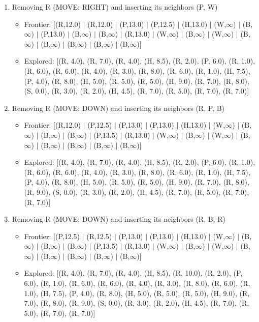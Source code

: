 \documentclass[12pt]{article}
\begin{document}
\begin{enumerate}
\item Removing R (MOVE: RIGHT) and inserting its neighbors (P, W)
\begin{itemize}
\item Frontier: [(R,12.0) \(|\) (R,12.0) \(|\) (P,13.0) \(|\) (P,12.5) \(|\) (H,13.0) \(|\) (W,\(\infty\)) \(|\) (B,\(\infty\)) \(|\) (P,13.0) \(|\) (B,\(\infty\)) \(|\) (B,\(\infty\)) \(|\) (R,13.0) \(|\) (W,\(\infty\)) \(|\) (B,\(\infty\)) \(|\) (W,\(\infty\)) \(|\) (B,\(\infty\)) \(|\) (B,\(\infty\)) \(|\) (B,\(\infty\)) \(|\) (B,\(\infty\)) \(|\) (B,\(\infty\))]
\item Explored: [(R, 4.0), (R, 7.0), (R, 4.0), (H, 8.5), (R, 2.0), (P, 6.0), (R, 1.0), (R, 6.0), (R, 6.0), (R, 4.0), (R, 3.0), (R, 8.0), (R, 6.0), (R, 1.0), (H, 7.5), (P, 4.0), (R, 8.0), (H, 5.0), (R, 5.0), (R, 5.0), (H, 9.0), (R, 7.0), (R, 8.0), (S, 0.0), (R, 3.0), (R, 2.0), (H, 4.5), (R, 7.0), (R, 5.0), (R, 7.0), (R, 7.0)]
\end{itemize}

\item Removing R (MOVE: DOWN) and inserting its neighbors (R, P, B)
\begin{itemize}
\item Frontier: [(R,12.0) \(|\) (P,12.5) \(|\) (P,13.0) \(|\) (P,13.0) \(|\) (H,13.0) \(|\) (W,\(\infty\)) \(|\) (B,\(\infty\)) \(|\) (B,\(\infty\)) \(|\) (B,\(\infty\)) \(|\) (P,13.5) \(|\) (R,13.0) \(|\) (W,\(\infty\)) \(|\) (B,\(\infty\)) \(|\) (W,\(\infty\)) \(|\) (B,\(\infty\)) \(|\) (B,\(\infty\)) \(|\) (B,\(\infty\)) \(|\) (B,\(\infty\)) \(|\) (B,\(\infty\))]
\item Explored: [(R, 4.0), (R, 7.0), (R, 4.0), (H, 8.5), (R, 2.0), (P, 6.0), (R, 1.0), (R, 6.0), (R, 6.0), (R, 4.0), (R, 3.0), (R, 8.0), (R, 6.0), (R, 1.0), (H, 7.5), (P, 4.0), (R, 8.0), (H, 5.0), (R, 5.0), (R, 5.0), (H, 9.0), (R, 7.0), (R, 8.0), (R, 9.0), (S, 0.0), (R, 3.0), (R, 2.0), (H, 4.5), (R, 7.0), (R, 5.0), (R, 7.0), (R, 7.0)]
\end{itemize}

\item Removing R (MOVE: DOWN) and inserting its neighbors (R, B, R)
\begin{itemize}
\item Frontier: [(P,12.5) \(|\) (R,12.5) \(|\) (P,13.0) \(|\) (P,13.0) \(|\) (H,13.0) \(|\) (W,\(\infty\)) \(|\) (B,\(\infty\)) \(|\) (B,\(\infty\)) \(|\) (B,\(\infty\)) \(|\) (P,13.5) \(|\) (R,13.0) \(|\) (W,\(\infty\)) \(|\) (B,\(\infty\)) \(|\) (W,\(\infty\)) \(|\) (B,\(\infty\)) \(|\) (B,\(\infty\)) \(|\) (B,\(\infty\)) \(|\) (B,\(\infty\)) \(|\) (B,\(\infty\))]
\item Explored: [(R, 4.0), (R, 7.0), (R, 4.0), (H, 8.5), (R, 10.0), (R, 2.0), (P, 6.0), (R, 1.0), (R, 6.0), (R, 6.0), (R, 4.0), (R, 3.0), (R, 8.0), (R, 6.0), (R, 1.0), (H, 7.5), (P, 4.0), (R, 8.0), (H, 5.0), (R, 5.0), (R, 5.0), (H, 9.0), (R, 7.0), (R, 8.0), (R, 9.0), (S, 0.0), (R, 3.0), (R, 2.0), (H, 4.5), (R, 7.0), (R, 5.0), (R, 7.0), (R, 7.0)]
\end{itemize}


\end{enumerate}
\end{document}
